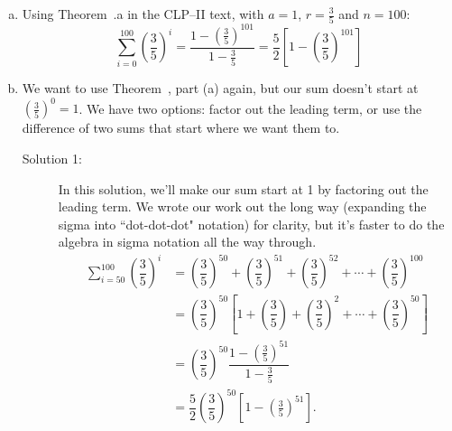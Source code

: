 \begin{solution}
\begin{enumerate}[(a)]
\item Using Theorem~.a in the CLP--II text,
with $a=1$, $r=\frac{3}{5}$ and $n=100$:
\[\sum_{i=0}^{100} \left(\dfrac{3}{5}\right)^i = \dfrac{1-\left(\frac{3}{5}\right)^{101}}{1-\frac{3}{5}} = \dfrac{5}{2}\left[1-\left(\frac{3}{5}\right)^{101}\right]\]
\item We want to use Theorem~, part (a) again, but our sum doesn't start at $\left(\frac{3}{5}\right)^0=1$. We have two options: factor out the leading term, or use the difference of two sums that start where we want them to.
\begin{description}
\item[Solution 1:] In this solution, we'll make our sum start at 1 by factoring out the leading term. We wrote our work out the long way (expanding the sigma into ``dot-dot-dot" notation) for clarity, but it's faster to do the algebra in sigma notation all the way through.
\begin{align*}
\displaystyle\sum_{i=50}^{100} \left(\dfrac{3}{5}\right)^i&=
 \left(\dfrac{3}{5}\right)^{50}+ \left(\dfrac{3}{5}\right)^{51}+ \left(\dfrac{3}{5}\right)^{52}+\cdots+ \left(\dfrac{3}{5}\right)^{100}\\
 &=
 \left(\dfrac{3}{5}\right)^{50}\left[1+ \left(\dfrac{3}{5}\right)+ \left(\dfrac{3}{5}\right)^{2}+\cdots+ \left(\dfrac{3}{5}\right)^{50}\right]
\\
&= \left(\dfrac{3}{5}\right)^{50}\dfrac{1-\left(\frac{3}{5}\right)^{51}}{1-\frac{3}{5}}\\
&=\dfrac{5}{2}\left(\dfrac{3}{5}\right)^{50}\left[1-\left(\frac{3}{5}\right)^{51}\right].
\end{align*}


\end{description}
\end{enumerate}
\end{solution}
